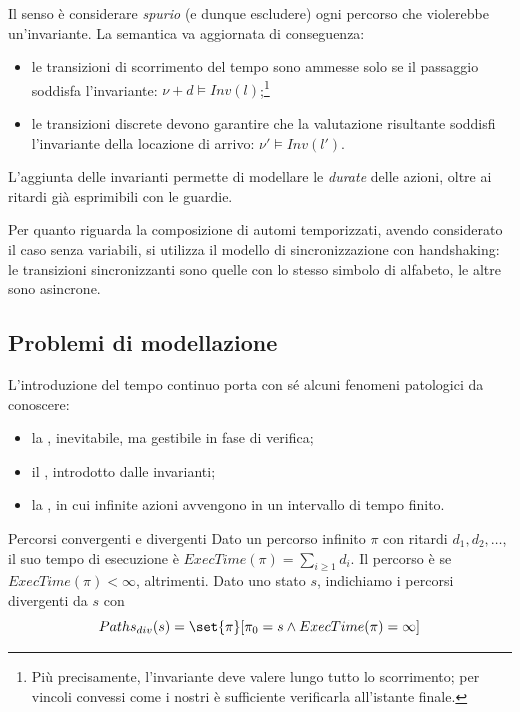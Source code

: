 Il senso è considerare \emph{spurio} (e dunque escludere) ogni percorso che violerebbe un'invariante. La semantica va aggiornata di conseguenza:
\begin{itemize}
  \item le transizioni di scorrimento del tempo sono ammesse solo se il passaggio soddisfa l'invariante: \(\nu + d \models Inv(l)\);\footnote{Più precisamente, l'invariante deve valere lungo tutto lo scorrimento; per vincoli convessi come i nostri è sufficiente verificarla all'istante finale.}
  \item le transizioni discrete devono garantire che la valutazione risultante soddisfi l'invariante della locazione di arrivo: \(\nu' \models Inv(l')\).
\end{itemize}

L'aggiunta delle invarianti permette di modellare le \emph{durate} delle azioni, oltre ai ritardi già esprimibili con le guardie.

Per quanto riguarda la composizione di automi temporizzati, avendo considerato il caso senza variabili, si utilizza il modello di sincronizzazione con handshaking: le transizioni sincronizzanti sono quelle con lo stesso simbolo di alfabeto, le altre sono asincrone.

\subsection{Problemi di modellazione}

L'introduzione del tempo continuo porta con sé alcuni fenomeni patologici da conoscere:
\begin{itemize}
  \item la , inevitabile, ma gestibile in fase di verifica;
  \item il , introdotto dalle invarianti;
  \item la , in cui infinite azioni avvengono in un intervallo di tempo finito.
\end{itemize}

\begin{definition}{Percorsi convergenti e divergenti}
  Dato un percorso infinito \(\pi\) con ritardi \(d_1, d_2, \ldots\), il suo tempo di esecuzione è \(ExecTime(\pi) = \sum_{i \geq 1} d_i\). Il percorso è  se \(ExecTime(\pi)<\infty\),  altrimenti. Dato uno stato \(s\), indichiamo i percorsi divergenti da \(s\) con
  \[Paths_{div}(s) = \set{\pi}[\pi_0 = s \land ExecTime(\pi) =\infty]\]
\end{definition}

